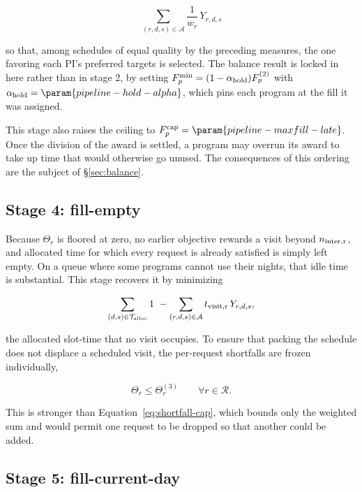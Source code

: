 \documentclass[twocolumn,linenumbers]{aastex63}
\def\Acal{\mathcal{A}}
\def\Rcal{\mathcal{R}}
\def\Tcal{\mathcal{T}}
\newcommand{\isr}[2]{\ensuremath{#1_{\rm #2}}\xspace}
\newcommand{\Fp}{\ensuremath{F_p}\xspace}
\newcommand{\minfill}{\ensuremath{F^{\rm min}_p}\xspace}
\newcommand{\maxfill}{\ensuremath{F^{\rm cap}_p}\xspace}
\begin{document}
\begin{equation}
  \sum_{(r,d,s) \in \Acal} \frac{1}{w_r} \, Y_{r,d,s}
  \label{eq:obj-prioritize}
\end{equation}

\noindent so that, among schedules of equal quality by the preceding measures,
the one favoring each PI's preferred targets is selected. The balance result is
locked in here rather than in stage 2, by setting
$\minfill = (1 - \alpha_{\rm hold}) \Fp^{(2)}$ with
$\alpha_{\rm hold} = \param{pipeline-hold-alpha}$, which pins each program at
the fill it was assigned.

This stage also raises the ceiling to $\maxfill = \param{pipeline-maxfill-late}$.
Once the division of the award is settled, a program may overrun its award to
take up time that would otherwise go unused. The consequences of this ordering
are the subject of \S\ref{sec:balance}.

\subsection{Stage 4: fill-empty}
\label{sec:stages:fillempty}

Because $\Theta_r$ is floored at zero, no earlier objective rewards a visit
beyond \isr{n}{inter,r}, and allocated time for which every request is already
satisfied is simply left empty. On a queue where some programs cannot use their
nights, that idle time is substantial. This stage recovers it by minimizing

\begin{equation}
  \sum_{(d,s) \in \Tcal_{\rm alloc}} 1
  \ - \sum_{(r,d,s) \in \Acal} \isr{t}{visit,r} \, Y_{r,d,s},
  \label{eq:obj-fillempty}
\end{equation}

\noindent the allocated slot-time that no visit occupies. To ensure that
packing the schedule does not displace a scheduled visit, the per-request
shortfalls are frozen individually,

\begin{equation}
  \Theta_r \le \Theta_r^{(3)} \qquad \forall r \in \Rcal .
  \label{eq:theta-freeze}
\end{equation}

\noindent This is stronger than Equation~\ref{eq:shortfall-cap}, which bounds
only the weighted sum and would permit one request to be dropped so that
another could be added.

\subsection{Stage 5: fill-current-day}
\label{sec:stages:fillcurrent}
\end{document}
